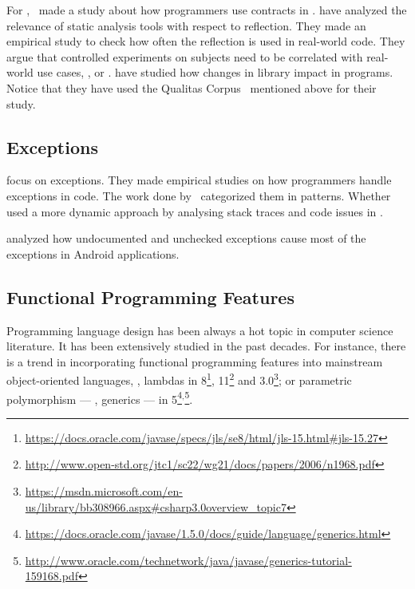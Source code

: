 For \java{},~\cite{dietrichContractsWildStudy2017a} made a study about how programmers use contracts in \mavencentral{}.
\cite{landmanChallengesStaticAnalysis2017} have analyzed the relevance of static analysis tools with respect to reflection.
They made an empirical study to check how often the reflection \api{} is used in real-world code.
They argue that controlled experiments on subjects need to be correlated with real-world use cases, \eg{}, \github{} or \mavencentral{}.
\cite{dietrichBrokenPromisesEmpirical2014} have studied how changes in \api{} library impact in \java{} programs.
Notice that they have used the Qualitas Corpus~\cite{temperoQualitasCorpusCurated2010} mentioned above for their study.

\subsection*{Exceptions}

\cite{keryExaminingProgrammerPractices2016,asaduzzamanHowDevelopersUse2016} focus on exceptions.
They made empirical studies on how programmers handle exceptions in \java{} code.
The work done by~\cite{nakshatriAnalysisExceptionHandling2016} categorized them in patterns.
Whether~\cite{coelhoUnveilingExceptionHandling2015} used a more dynamic approach by analysing stack traces and code issues in \github{}.

\cite{kechagiaUndocumentedUncheckedExceptions2014} analyzed how undocumented and
unchecked exceptions cause most of the exceptions in
Android applications.

\subsection*{Functional Programming Features}

Programming language design has been always a hot topic in computer science literature.
It has been extensively studied in the past decades.
For instance, there is a trend in incorporating functional programming features into mainstream object-oriented languages, \eg, lambdas in \java{} 8\footnote{\url{https://docs.oracle.com/javase/specs/jls/se8/html/jls-15.html\#jls-15.27}}, \cpp{}11\footnote{\url{http://www.open-std.org/jtc1/sc22/wg21/docs/papers/2006/n1968.pdf}} and \cs{} 3.0\footnote{\url{https://msdn.microsoft.com/en-us/library/bb308966.aspx\#csharp3.0overview\_topic7}}; or parametric polymorphism --- \ie{}, generics --- in \java{} 5\footnote{\url{https://docs.oracle.com/javase/1.5.0/docs/guide/language/generics.html}}\(^{,}\)\footnote{\url{http://www.oracle.com/technetwork/java/javase/generics-tutorial-159168.pdf}}.

